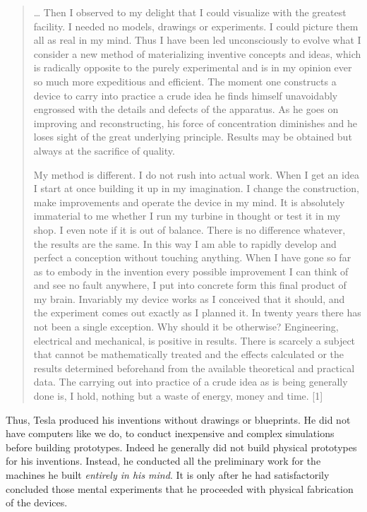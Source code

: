 \documentclass[
  11pt,
  a4paper,
]{article}
\begin{document}
\begin{quote}
\ldots{} Then I observed to my delight that I could visualize with the
greatest facility. I needed no models, drawings or experiments. I could
picture them all as real in my mind. Thus I have been led unconsciously
to evolve what I consider a new method of materializing inventive
concepts and ideas, which is radically opposite to the purely
experimental and is in my opinion ever so much more expeditious and
efficient. The moment one constructs a device to carry into practice a
crude idea he finds himself unavoidably engrossed with the details and
defects of the apparatus. As he goes on improving and reconstructing,
his force of concentration diminishes and he loses sight of the great
underlying principle. Results may be obtained but always at the
sacrifice of quality.

My method is different. I do not rush into actual work. When I get an
idea I start at once building it up in my imagination. I change the
construction, make improvements and operate the device in my mind. It is
absolutely immaterial to me whether I run my turbine in thought or test
it in my shop. I even note if it is out of balance. There is no
difference whatever, the results are the same. In this way I am able to
rapidly develop and perfect a conception without touching anything. When
I have gone so far as to embody in the invention every possible
improvement I can think of and see no fault anywhere, I put into
concrete form this final product of my brain. Invariably my device works
as I conceived that it should, and the experiment comes out exactly as I
planned it. In twenty years there has not been a single exception. Why
should it be otherwise? Engineering, electrical and mechanical, is
positive in results. There is scarcely a subject that cannot be
mathematically treated and the effects calculated or the results
determined beforehand from the available theoretical and practical data.
The carrying out into practice of a crude idea as is being generally
done is, I hold, nothing but a waste of energy, money and time. {[}1{]}
\end{quote}

Thus, Tesla produced his inventions without drawings or blueprints. He
did not have computers like we do, to conduct inexpensive and complex
simulations before building prototypes. Indeed he generally did not
build physical prototypes for his inventions. Instead, he conducted all
the preliminary work for the machines he built \emph{entirely in his
mind}. It is only after he had satisfactorily concluded those mental
experiments that he proceeded with physical fabrication of the devices.
\end{document}
